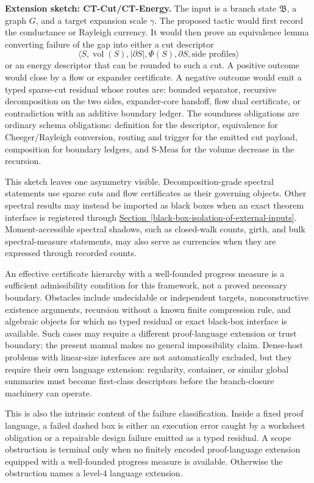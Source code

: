\documentclass[
  11pt,
]{article}
\theoremstyle{definition}
\newcommand{\secref}[1]{\hyperref[#1]{Section~\ref*{#1}}}
\begin{document}
\textbf{Extension sketch: CT-Cut/CT-Energy.} The input is a branch state
\(\mathfrak B\), a graph \(G\), and a target expansion scale \(\gamma\).
The proposed tactic would first record the conductance or Rayleigh
currency. It would then prove an equivalence lemma converting failure of
the gap into either a
cut descriptor
\[
\langle S,\operatorname{vol}(S),|\partial S|,\Phi(S),\partial S,
\text{side profiles}\rangle
\]
or an energy descriptor that can be rounded to such a cut. A positive
outcome would close by a flow or expander certificate. A negative outcome
would emit a typed sparse-cut residual whose routes are: bounded separator,
recursive decomposition on the two sides, expander-core handoff, flow
dual certificate, or contradiction with an additive boundary ledger. The
soundness obligations are ordinary schema obligations: definition for the
descriptor, equivalence for Cheeger/Rayleigh conversion, routing and trigger
for the emitted cut payload, composition for boundary ledgers, and S-Meas for
the volume decrease in the recursion.

This sketch leaves one asymmetry visible. Decomposition-grade spectral
statements use sparse cuts and flow certificates as their governing
objects. Other spectral results may instead be imported as black boxes
when an exact theorem interface is registered through
\secref{black-box-isolation-of-external-inputs}. Moment-accessible
spectral shadows, such as closed-walk counts, girth, and bulk
spectral-measure statements, may also serve as currencies when they are
expressed through recorded counts.

An effective certificate hierarchy with a well-founded progress measure
is a sufficient admissibility condition for this framework, not a proved
necessary boundary. Obstacles include undecidable or independent
targets, nonconstructive existence arguments, recursion without a known
finite compression rule, and algebraic objects for which no typed
residual or exact black-box interface is available. Such cases may
require a different proof-language extension or trust boundary; the
present manual makes no general impossibility claim. Dense-host
problems with linear-size interfaces are not automatically excluded, but
they require their own language extension: regularity, container, or
similar global summaries must become first-class descriptors before the
branch-closure machinery can operate.

This is also the intrinsic content of the failure classification. Inside
a fixed proof language, a failed dashed box is either an execution error
caught by a worksheet obligation or a repairable design failure emitted
as a typed residual. A scope obstruction is terminal only when no
finitely encoded proof-language extension equipped with a well-founded
progress measure is available. Otherwise the obstruction names a level-4
language extension.
\end{document}
